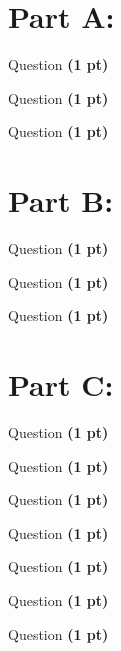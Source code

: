 \documentclass[12pt,a4paper]{article}
\begin{document}
\section*{Part A: }
\begin{enumerate}[font=\bfseries, wide]
    {\color{under}\item Question \textbf{(1 pt)}}
    
    
    {\color{under}\item Question \textbf{(1 pt)}}
    
    
    {\color{under}\item Question \textbf{(1 pt)}}
    
    
\end{enumerate}

\section*{Part B: }
\begin{enumerate}[font=\bfseries, wide, resume]
    {\color{under}\item Question \textbf{(1 pt)}}
    
    
    {\color{under}\item Question \textbf{(1 pt)}}
    
    
    {\color{under}\item Question \textbf{(1 pt)}}
    
    
\end{enumerate}
    
\section*{Part C: }
\begin{enumerate}[font=\bfseries, wide, resume]
    {\color{under}\item Question \textbf{(1 pt)}}
    
    
    {\color{under}\item Question \textbf{(1 pt)}}
    
    
    {\color{under}\item Question \textbf{(1 pt)}}
    
    
    {\color{under}\item Question \textbf{(1 pt)}}
    
    
    {\color{under}\item Question \textbf{(1 pt)}}
    
    
    {\color{under}\item Question \textbf{(1 pt)}}
    
    
    {\color{under}\item Question \textbf{(1 pt)}}
    
    
\end{enumerate}
\end{document}
